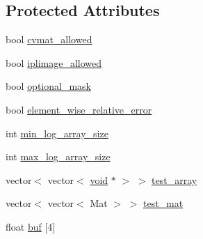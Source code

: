 \subsection*{Protected Attributes}
\begin{DoxyCompactItemize}
\item 
bool \hyperlink{classcvtest_1_1ArrayTest_a1f4553b85f201d9c25919f78398fd5f5}{cvmat\-\_\-allowed}
\item 
bool \hyperlink{classcvtest_1_1ArrayTest_a25909ac704312c5f5a5afee40af733c8}{iplimage\-\_\-allowed}
\item 
bool \hyperlink{classcvtest_1_1ArrayTest_ae9110151b5c27634ef65740fa47b5b14}{optional\-\_\-mask}
\item 
bool \hyperlink{classcvtest_1_1ArrayTest_a1fdc46ad69035aeb69af56e8216ead1e}{element\-\_\-wise\-\_\-relative\-\_\-error}
\item 
int \hyperlink{classcvtest_1_1ArrayTest_aa1d9ddceef2a8506b35ad15bf8fb2eb9}{min\-\_\-log\-\_\-array\-\_\-size}
\item 
int \hyperlink{classcvtest_1_1ArrayTest_ad40bd03e65feae23ae3272fa3f883f55}{max\-\_\-log\-\_\-array\-\_\-size}
\item 
vector$<$ vector$<$ \hyperlink{legacy_8hpp_a8bb47f092d473522721002c86c13b94e}{void} $\ast$ $>$ $>$ \hyperlink{classcvtest_1_1ArrayTest_a91adf0d976aff496c67228830c38b771}{test\-\_\-array}
\item 
vector$<$ vector$<$ Mat $>$ $>$ \hyperlink{classcvtest_1_1ArrayTest_a9f221cafbb615b279aa697e18b42c26e}{test\-\_\-mat}
\item 
float \hyperlink{classcvtest_1_1ArrayTest_aa0dd78bbc77866c200215af22aa5bdcc}{buf} \mbox{[}4\mbox{]}
\end{DoxyCompactItemize}


